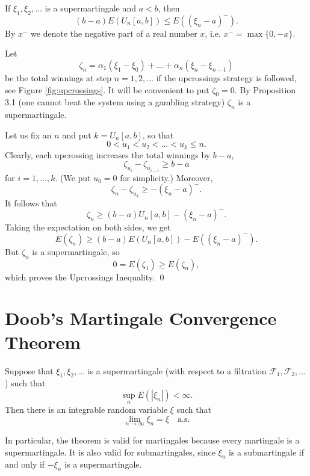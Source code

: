 \begin{Lemma}
\label{lma:UpcrossingsInequality}
If $\xi_1, \xi_2, \ldots$ is a supermartingale and $a < b$, then
\[
(b - a) E (U_{n}[a, b]) \leq E ((\xi_{n} - a)^{-}).
\]
By $x^{-}$ we denote the negative part of a real number $x$, i.e. $x^{-} = \max \{0, -x\}$.
\end{Lemma}

\begin{Proof}
Let
\[
\zeta_{n} = \alpha_{1} (\xi_{1} - \xi_{0}) + \dots + \alpha_{n} (\xi_{n} - \xi_{n-1})
\]
be the total winnings at step $n = 1,2,\ldots$ if the upcrossings strategy is followed, see Figure \ref{fig:upcrossings}. It will be convenient to put $\zeta_0 = 0$. By Proposition 3.1 (one cannot beat the system using a gambling strategy) $\zeta_n$ is a supermartingale.

Let us fix an $n$ and put $k = U_{n}[a, b]$, so that
\[
0 < u_{1} < u_{2} < \dots < u_{k} \leq n.
\]
Clearly, each upcrossing increases the total winnings by $b - a$,
\[
\zeta_{u_i} - \zeta_{u_{i-1}} \geq b - a
\]
for $i = 1, \ldots, k$. (We put $u_0 = 0$ for simplicity.) Moreover,
\[
\zeta_{n} - \zeta_{u_k} \geq -(\xi_{n} - a)^{-}.
\]
It follows that
\[
\zeta_{n} \geq (b - a) U_{n}[a, b] - (\xi_{n} - a)^{-}.
\]
Taking the expectation on both sides, we get
\[
E \left(\zeta_{n}\right) \geq (b - a) E (U_{n}[a, b]) - E ((\xi_{n} - a)^{-}).
\]
But $\zeta_{n}$ is a supermartingale, so
\[
0 = E (\zeta_{1}) \geq E (\zeta_{n}),
\]
which proves the Upcrossings Inequality. \qed
\end{Proof}

\section{Doob's Martingale Convergence Theorem}
\label{sec:DoobsMartingaleConvergenceTheorem}

\begin{Theorem}
\label{th:DoobsMartingaleConvergenceTheorem}
Suppose that $\xi_1, \xi_2, \ldots$ is a supermartingale (with respect to a filtration $\mathcal{F}_1, \mathcal{F}_2, \ldots$) such that
\[
\sup_{n} E \left(\left| \xi_{n} \right|\right) < \infty .
\]
Then there is an integrable random variable $\xi$ such that
\[
\lim_{n \rightarrow \infty} \xi_{n} = \xi \quad \text{a.s.}
\]
\end{Theorem}

\begin{Remark}
\label{rem:MartingaleConvergenceRemark1}
In particular, the theorem is valid for martingales because every martingale is a supermartingale. It is also valid for submartingales, since $\xi_{n}$ is a submartingale if and only if $-\xi_{n}$ is a supermartingale.
\end{Remark}

